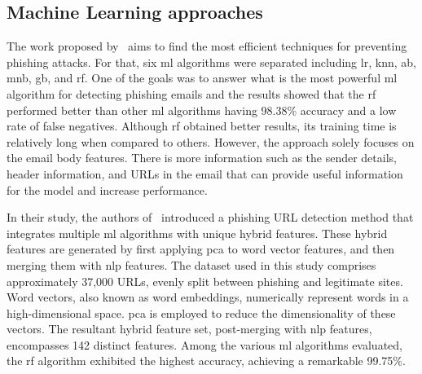 \begin{comment}
    \citet{Gutierrez2018988} mentioned that the most common defensive approaches frequently display a lack of adaptability. This is primarily because of its basis in rigid frameworks like regular expressions that recognize specific text patterns. This limitation highlights how important it is to find different methods to improve phishing detection. The problem with already existing automated solutions, built to manage the flood of phishing emails, is to quickly detect unseen phishing attempts. A major flaw in these solutions is their reliance on surface-level text analysis rather than exploring deeper linguistic patterns and deceitful strategies, such as the use of synonyms and varied sentence structures.
    In the proposed solution they used advanced \ac{nlp} techniques like Named Entity Recognition that its used to recognize different entity types, such as persons, locations, organizations, within the text, and Freebase that essentialy returns potential categories the entity belongs to and provides a score of how relevant each category is. These two techniques form a set of higher-level features, that also includes synonym substitution, to better understand the semantics of phishing emails.
\end{comment}


\subsection{Machine Learning approaches}


The work proposed by~\citet{rabbi2023phishy} aims to find the most efficient techniques for preventing phishing attacks. For that, six \ac{ml} algorithms were separated including \ac{lr}, \ac{knn}, \ac{ab}, \ac{mnb}, \ac{gb}, and \ac{rf}. One of the goals was to answer what is the most powerful \ac{ml} algorithm for detecting phishing emails and the results showed that the \ac{rf} performed better than other \ac{ml} algorithms having 98.38\% accuracy and a low rate of false negatives. Although \ac{rf} obtained better results, its training time is relatively long when compared to others. However, the approach solely focuses on the email body features. There is more information such as the sender details, header information, and URLs in the email that can provide useful information for the model and increase performance.

In their study, the authors of~\cite{Kumar2023222} introduced a phishing URL detection method that integrates multiple \ac{ml} algorithms with unique hybrid features. These hybrid features are generated by first applying \ac{pca} to word vector features, and then merging them with \ac{nlp} features. The dataset used in this study comprises approximately 37,000 URLs, evenly split between phishing and legitimate sites. Word vectors, also known as word embeddings, numerically represent words in a high-dimensional space. \ac{pca} is employed to reduce the dimensionality of these vectors. The resultant hybrid feature set, post-merging with \ac{nlp} features, encompasses 142 distinct features. Among the various \ac{ml} algorithms evaluated, the \ac{rf} algorithm exhibited the highest accuracy, achieving a remarkable 99.75\%.

